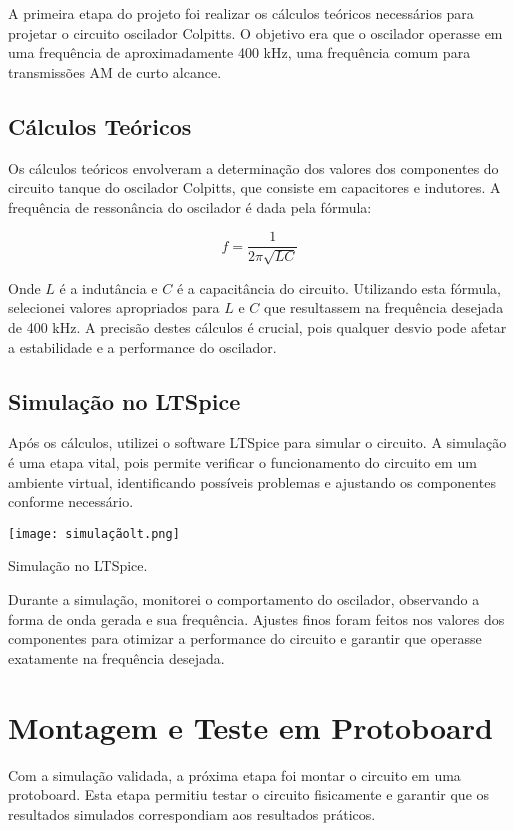 \documentclass[
]{book}
\begin{document}
A primeira etapa do projeto foi realizar os cálculos teóricos necessários para projetar o circuito oscilador Colpitts. O objetivo era que o oscilador operasse em uma frequência de aproximadamente 400 kHz, uma frequência comum para transmissões AM de curto alcance.

\subsection{Cálculos Teóricos}\label{cuxe1lculos-teuxf3ricos}

Os cálculos teóricos envolveram a determinação dos valores dos componentes do circuito tanque do oscilador Colpitts, que consiste em capacitores e indutores. A frequência de ressonância do oscilador é dada pela fórmula:

\[ f = \frac{1}{2\pi\sqrt{LC}} \]

Onde \(L\) é a indutância e \(C\) é a capacitância do circuito. Utilizando esta fórmula, selecionei valores apropriados para \(L\) e \(C\) que resultassem na frequência desejada de 400 kHz. A precisão destes cálculos é crucial, pois qualquer desvio pode afetar a estabilidade e a performance do oscilador.

\subsection{Simulação no LTSpice}\label{simulauxe7uxe3o-no-ltspice}

Após os cálculos, utilizei o software LTSpice para simular o circuito. A simulação é uma etapa vital, pois permite verificar o funcionamento do circuito em um ambiente virtual, identificando possíveis problemas e ajustando os componentes conforme necessário.

\texttt{[image: simulaçãolt.png]}

Simulação no LTSpice.

Durante a simulação, monitorei o comportamento do oscilador, observando a forma de onda gerada e sua frequência. Ajustes finos foram feitos nos valores dos componentes para otimizar a performance do circuito e garantir que operasse exatamente na frequência desejada.

\section{Montagem e Teste em Protoboard}\label{montagem-e-teste-em-protoboard}

Com a simulação validada, a próxima etapa foi montar o circuito em uma protoboard. Esta etapa permitiu testar o circuito fisicamente e garantir que os resultados simulados correspondiam aos resultados práticos.
\end{document}
